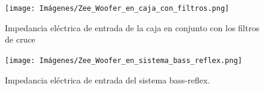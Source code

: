 \documentclass[10pt]{article}
\begin{document}
\begin{figure}[hbtp]
  \centering
  \texttt{[image: Imágenes/Zee\_Woofer\_en\_caja\_con\_filtros.png]}
  \caption{Impedancia eléctrica de entrada de la caja en conjunto con los filtros de cruce}
  \label{fig:Zee_Woofer_en_caja_con_filtros.png}
\end{figure}

\begin{figure}[hbtp]
  \centering
  \texttt{[image: Imágenes/Zee\_Woofer\_en\_sistema\_bass\_reflex.png]}
  \caption{Impedancia eléctrica de entrada del sistema bass-reflex.}
  \label{fig:Zee_Woofer_en_sistema_bass_reflex.png}
\end{figure}
\end{document}
